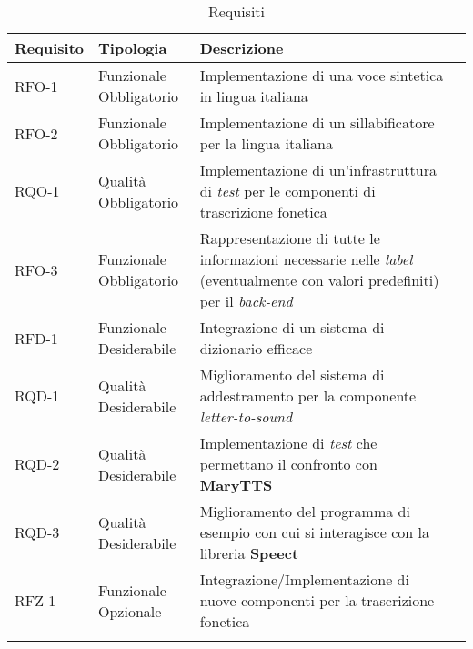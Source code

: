       \begin{center}
        \bgroup
        \def\arraystretch{1.8}
        \begin{longtable}{ | l | p{2cm} | p{4.7cm} | p{2.5cm} |}
        \hline
        \textbf{Requisito} & \textbf{Tipologia}
        & \textbf{Descrizione} \\ \hline
        RFO-1 & Funzionale \newline Obbligatorio & Implementazione di una voce sintetica in lingua italiana \newline  \\ \hline
        RFO-2 & Funzionale \newline Obbligatorio & Implementazione di un sillabificatore per la lingua italiana \newline  \\ \hline
        RQO-1 & Qualità \newline Obbligatorio & Implementazione di un'infrastruttura di \textit{test} per le componenti di 
                              trascrizione fonetica \newline  \\ \hline
        RFO-3 & Funzionale \newline Obbligatorio & Rappresentazione di tutte le informazioni
                              necessarie nelle \textit{label} (eventualmente con valori predefiniti) per il \textit{back-end} \newline  \\ \hline
         
        RFD-1 & Funzionale \newline Desiderabile & Integrazione di un sistema di dizionario efficace \newline  \\ \hline
        RQD-1 & Qualità \newline Desiderabile & Miglioramento del sistema di addestramento per
                        la componente \textit{letter-to-sound} \newline  \\ \hline
        RQD-2 & Qualità \newline Desiderabile & Implementazione di \textit{test} che permettano 
                il confronto con \textbf{MaryTTS} \newline  \\ \hline
        RQD-3 & Qualità \newline Desiderabile & Miglioramento del programma di esempio con cui si 
                interagisce con la libreria \textbf{Speect} \newline  \\ \hline                 

        RFZ-1 & Funzionale \newline Opzionale & Integrazione/Implementazione di nuove componenti 
                per la trascrizione fonetica \newline  \\ \hline

        \caption{Requisiti}
        \end{longtable}
        \egroup
     \end{center}
